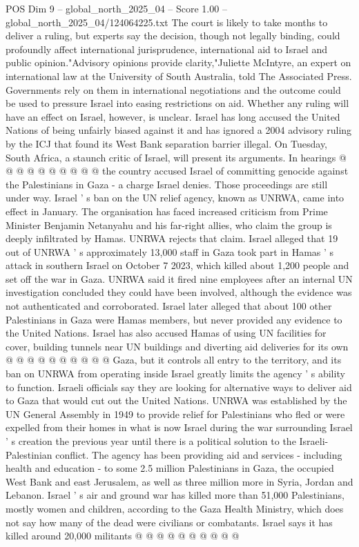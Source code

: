 \begin{textsample}{POS Dim 9 – global\_north\_2025\_04 – Score 1.00 – global\_north\_2025\_04/124064225.txt}
The court is likely to take months to deliver a ruling, but experts say the decision, though not legally binding, could profoundly affect international jurisprudence, international aid to Israel and public opinion."Advisory opinions provide clarity,"Juliette McIntyre, an expert on international law at the University of South Australia, told The Associated Press.
Governments rely on them in international negotiations and the outcome could be used to pressure Israel into easing restrictions on aid.
Whether any ruling will have an effect on Israel, however, is unclear.
Israel has long accused the United Nations of being unfairly biased against it and has ignored a 2004 advisory ruling by the ICJ that found its West Bank separation barrier illegal.
On Tuesday, South Africa, a staunch critic of Israel, will present its arguments.
In hearings @ @ @ @ @ @ @ @ @ @ the country accused Israel of committing genocide against the Palestinians in Gaza - a charge Israel denies.
Those proceedings are still under way.
Israel ' s ban on the UN relief agency, known as UNRWA, came into effect in January.
The organisation has faced increased criticism from Prime Minister Benjamin Netanyahu and his far-right allies, who claim the group is deeply infiltrated by Hamas.
UNRWA rejects that claim.
Israel alleged that 19 out of UNRWA ' s approximately 13,000 staff in Gaza took part in Hamas ' s attack in southern Israel on October 7 2023, which killed about 1,200 people and set off the war in Gaza.
UNRWA said it fired nine employees after an internal UN investigation concluded they could have been involved, although the evidence was not authenticated and corroborated.
Israel later alleged that about 100 other Palestinians in Gaza were Hamas members, but never provided any evidence to the United Nations.
Israel has also accused Hamas of using UN facilities for cover, building tunnels near UN buildings and diverting aid deliveries for its own @ @ @ @ @ @ @ @ @ @ Gaza, but it controls all entry to the territory, and its ban on UNRWA from operating inside Israel greatly limits the agency ' s ability to function.
Israeli officials say they are looking for alternative ways to deliver aid to Gaza that would cut out the United Nations.
UNRWA was established by the UN General Assembly in 1949 to provide relief for Palestinians who fled or were expelled from their homes in what is now Israel during the war surrounding Israel ' s creation the previous year until there is a political solution to the Israeli-Palestinian conflict.
The agency has been providing aid and services - including health and education - to some 2.5 million Palestinians in Gaza, the occupied West Bank and east Jerusalem, as well as three million more in Syria, Jordan and Lebanon.
Israel ' s air and ground war has killed more than 51,000 Palestinians, mostly women and children, according to the Gaza Health Ministry, which does not say how many of the dead were civilians or combatants.
Israel says it has killed around 20,000 militants @ @ @ @ @ @ @ @ @ @

\end{textsample}
